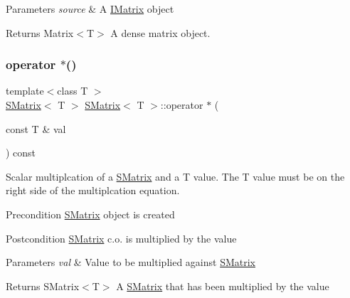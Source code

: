 \begin{DoxyParams}{Parameters}
{\em source} & A \mbox{\hyperlink{class_i_matrix}{I\+Matrix}} object \\
\hline
\end{DoxyParams}
\begin{DoxyReturn}{Returns}
Matrix$<$\+T$>$ A dense matrix object. 
\end{DoxyReturn}
\mbox{\label{class_s_matrix_aa01badd1e585fe9c362d21bc79925c80}} 
\subsubsection{\texorpdfstring{operator $\ast$()}{operator *()}}
{\footnotesize\ttfamily template$<$class T $>$ \\
\mbox{\hyperlink{class_s_matrix}{S\+Matrix}}$<$ T $>$ \mbox{\hyperlink{class_s_matrix}{S\+Matrix}}$<$ T $>$\+::operator $\ast$ (\begin{DoxyParamCaption}\item[{const T \&}]{val }\end{DoxyParamCaption}) const\hspace{0.3cm}{\ttfamily [virtual]}}



Scalar multiplcation of a \mbox{\hyperlink{class_s_matrix}{S\+Matrix}} and a T value. The T value must be on the right side of the multiplcation equation. 

\begin{DoxyPrecond}{Precondition}
\mbox{\hyperlink{class_s_matrix}{S\+Matrix}} object is created 
\end{DoxyPrecond}
\begin{DoxyPostcond}{Postcondition}
\mbox{\hyperlink{class_s_matrix}{S\+Matrix}} c.\+o. is multiplied by the value 
\end{DoxyPostcond}

\begin{DoxyParams}{Parameters}
{\em val} & Value to be multiplied against \mbox{\hyperlink{class_s_matrix}{S\+Matrix}} \\
\hline
\end{DoxyParams}
\begin{DoxyReturn}{Returns}
S\+Matrix$<$\+T$>$ A \mbox{\hyperlink{class_s_matrix}{S\+Matrix}} that has been multiplied by the value 
\end{DoxyReturn}


